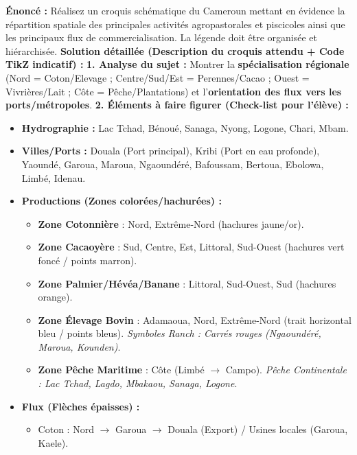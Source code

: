 \documentclass[11pt]{article}
\begin{document}
\begin{exoresolu}
\textbf{Énoncé :} Réalisez un croquis schématique du Cameroun mettant en évidence la répartition spatiale des principales activités agropastorales et piscicoles ainsi que les principaux flux de commercialisation. La légende doit être organisée et hiérarchisée.
\tcblower
\textbf{Solution détaillée (Description du croquis attendu + Code TikZ indicatif) :}
\textbf{1. Analyse du sujet :} Montrer la \textbf{spécialisation régionale} (Nord = Coton/Elevage ; Centre/Sud/Est = Perennes/Cacao ; Ouest = Vivrières/Lait ; Côte = Pêche/Plantations) et l'\textbf{orientation des flux vers les ports/métropoles}.
\textbf{2. Éléments à faire figurer (Check-list pour l'élève) :}
\begin{itemize}
    \item \textbf{Hydrographie :} Lac Tchad, Bénoué, Sanaga, Nyong, Logone, Chari, Mbam.
    \item \textbf{Villes/Ports :} Douala (Port principal), Kribi (Port en eau profonde), Yaoundé, Garoua, Maroua, Ngaoundéré, Bafoussam, Bertoua, Ebolowa, Limbé, Idenau.
    \item \textbf{Productions (Zones colorées/hachurées) :}
    \begin{itemize}
        \item \textcolor{popgold}{\textbf{Zone Cotonnière}} : Nord, Extrême-Nord (hachures jaune/or).
        \item \textcolor{popgreen}{\textbf{Zone Cacaoyère}} : Sud, Centre, Est, Littoral, Sud-Ouest (hachures vert foncé / points marron).
        \item \textcolor{poporange}{\textbf{Zone Palmier/Hévéa/Banane}} : Littoral, Sud-Ouest, Sud (hachures orange).
        \item \textcolor{popblue}{\textbf{Zone Élevage Bovin}} : Adamaoua, Nord, Extrême-Nord (trait horizontal bleu / points bleus). \textit{Symboles Ranch : Carrés rouges (Ngaoundéré, Maroua, Kounden)}.
        \item \textcolor{poppurple}{\textbf{Zone Pêche Maritime}} : Côte (Limbé $\to$ Campo). \textit{Pêche Continentale : Lac Tchad, Lagdo, Mbakaou, Sanaga, Logone}.
    \end{itemize}
    \item \textbf{Flux (Flèches épaisses) :}
    \begin{itemize}
        \item Coton : Nord $\to$ Garoua $\to$ Douala (Export) / Usines locales (Garoua, Kaele).

\end{itemize}
\end{itemize}
\end{exoresolu}
\end{document}
